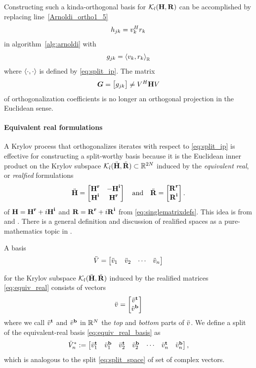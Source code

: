 Constructing such a kinda-orthogonal basis for  $\mathcal{K}_{l}({\textbf{\textup{H}}},{\textbf{\textup{R}}})$ can be accomplished  
by replacing line~\ref{Arnoldi_ortho1_5}
\[
h_{jk} = v_k^Hr_k
\]
 in algorithm~\ref{alg:arnoldi} with 
\[
g_{jk} = \left< v_k,r_k \right>_{\mathbb{R}}
\]
where $\left< \cdot,\cdot \right>$ is defined by \eqref{eq:split_ip}.  The matrix 
\begin{equation}
\boldsymbol{G}=\begin{bmatrix} g_{jk}\end{bmatrix} \neq V^H \textbf{\textup{H}} V
\label{eq:Gmat} 
\end{equation}
of orthogonalization coefficients is no longer an orthogonal projection in the Euclidean sense. 


   
\paragraph{Equivalent real formulations} 
A Krylov process that orthogonalizes iterates with respect to \eqref{eq:split_ip} is effective for constructing a split-worthy basis because it is the Euclidean inner product on the Krylov subspace $\mathcal{K}_{l}({{\ddot{\textbf{\textup{H}}}}},{{\ddot{\textbf{\textup{R}}}}})\subset\mathbb{R}^{2N}$ induced by  the
\emph{equivalent real}, or \emph{realfied} formulations 
 \begin{equation}
 {\ddot{\textbf{\textup{H}}}} = \begin{bmatrix} \textbf{\textup{H}}^{\mathrm{\bf{r}}}_{} & -\textbf{\textup{H}}^{\mathrm{\bf{i}}}_{}\\ \textbf{\textup{H}}^{\mathrm{\bf{i}}}_{} & \textbf{\textup{H}}^{\mathrm{\bf{r}}}_{} \end{bmatrix}
 \quad\text{and}\quad {\ddot{\textbf{\textup{R}}}} = \begin{bmatrix} \textbf{\textup{R}}^{\mathrm{\bf{r}}}_{}\\\textbf{\textup{R}}^{\mathrm{\bf{i}}}_{}\end{bmatrix}.
 \label{eq:equiv_real}
 \end{equation}
of $\textbf{\textup{H}}=\textbf{\textup{H}}^{\mathrm{\bf{r}}}_{} + i\textbf{\textup{H}}^{\mathrm{\bf{i}}}_{}$ and $\textbf{\textup{R}}=\textbf{\textup{R}}^{\mathrm{\bf{r}}}_{}+i\textbf{\textup{R}}^{\mathrm{\bf{i}}}_{}$  from \eqref{eq:singlematrixdefs}.
This idea is from \cite[Sec. 5]{complex_strategies} and \cite[`$K1$-formulation']{day_heroux}. There is a general definition and discussion of realified spaces as a pure-mathematics topic in \cite{palmer2001banach}. 

 A basis
 \begin{equation}
 \ddot{V} = \begin{bmatrix} \ddot{v}_1&\ddot{v}_2&\cdots&\ddot{v}_n\end{bmatrix}
 \label{eq:equiv_real_basis}
 \end{equation}

 for  the Krylov subspace $\mathcal{K}_{l}({{\ddot{\textbf{\textup{H}}}}},{{\ddot{\textbf{\textup{R}}}}})$ induced by the realified matrices \eqref{eq:equiv_real} consists of  vectors
\[  
\ddot{v} = \begin{bmatrix}  \ddot{v}^{\mathrm{\bf{t}}}_{} \\ \ddot{v}^{\mathrm{\bf{b}}}_{} \end{bmatrix}
\]
where we call $\ddot{v}^{\mathrm{\bf{t}}}_{}$ and $\ddot{v}^{\mathrm{\bf{b}}}_{}$ in $\mathbb{R}^N$ the \emph{top} and \emph{bottom} parts of $\ddot{v}$.
 We define a split of the equivalent-real basis \eqref{eq:equiv_real_basis} as
 \begin{equation}
 \ddot{V}_n^* : = \begin{bmatrix} \ddot{v}^{\mathrm{\bf{t}}}_{1} & \ddot{v}^{\mathrm{\bf{b}}}_{1} & \ddot{v}^{\mathrm{\bf{t}}}_{2} & \ddot{v}^{\mathrm{\bf{b}}}_{2}
	 & \cdots & \ddot{v}^{\mathrm{\bf{t}}}_{n} & \ddot{v}^{\mathrm{\bf{b}}}_{n} \end{bmatrix},
 \label{eq:split2}
 \end{equation}
which is analogous to the split \eqref{eq:split_space} of set of complex vectors. 

